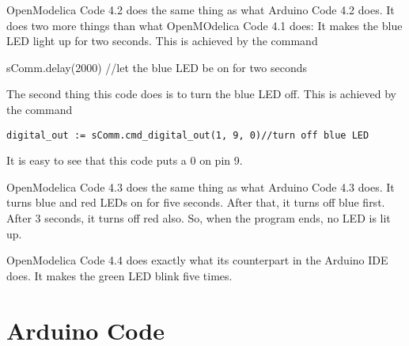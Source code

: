 OpenModelica Code 4.2 does the same thing as what Arduino Code 4.2 does. It does
two more things than what OpenMOdelica Code 4.1 does: It makes the blue LED light
up for two seconds. This is achieved by the command

sComm.delay(2000)  //let the blue LED be on for two seconds

The second thing this code does is to turn the blue LED off. This is achieved
by the command

\begin{lstlisting}[style=nonumbers]
     digital_out := sComm.cmd_digital_out(1, 9, 0)//turn off blue LED
  \end{lstlisting}

It is easy to see that this code puts a 0 on pin 9.

OpenModelica Code 4.3 does the same thing as what Arduino Code 4.3 does. It turns
blue and red LEDs on for five seconds. After that, it turns off blue first. After
3 seconds, it turns off red also. So, when the program ends, no LED is lit up.

OpenModelica Code 4.4 does exactly what its counterpart in the Arduino IDE does.
It makes the green LED blink five times. 



\clearpage
\section{Arduino Code}
\lstset{style=mystyle}
\label{sec:led-arduino-code}

\begin{ardcode}
\label{ard:led-blue}

\end{ardcode}

\begin{ardcode}
\label{ard:led-blue-delay}

\end{ardcode}

\begin{ardcode}
\label{ard:led-blue-red}

\end{ardcode}

